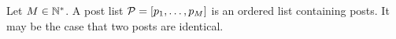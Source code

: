 \begin{definition}
  Let $M \in \mathbb{N}^*$. A post list $\mathcal{P} = \left[p_1,
  \dots, p_M\right]$ is an ordered list containing posts. It may be
  the case that two posts are identical.
\end{definition}
